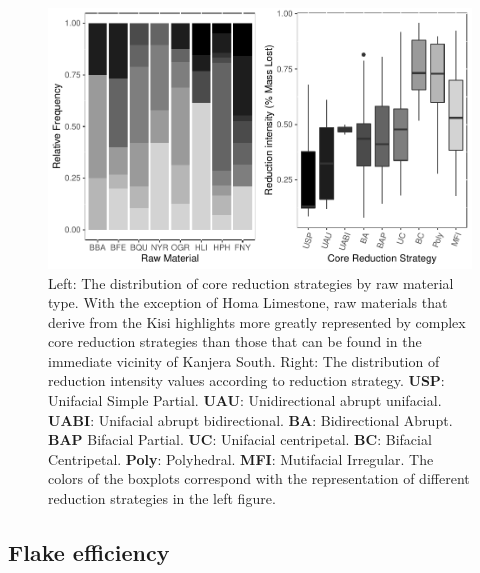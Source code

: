 \documentclass[]{elsarticle} %
\makeatletter
\def\maxwidth{\ifdim\Gin@nat@width>\linewidth\linewidth
\else\Gin@nat@width\fi}
\let\Oldincludegraphics\includegraphics
\renewcommand{\includegraphics}[1]{\Oldincludegraphics[width=\maxwidth]{#1}}
\makeatother
\begin{document}
\begin{figure}
\centering
\includegraphics{Reeves_Braun_et_al_2020_Kanjera_South_JHE_files/figure-latex/fig-6-1.pdf}
\caption{Left: The distribution of core reduction strategies by raw
material type. With the exception of Homa Limestone, raw materials that
derive from the Kisi highlights more greatly represented by complex core
reduction strategies than those that can be found in the immediate
vicinity of Kanjera South. Right: The distribution of reduction
intensity values according to reduction strategy. \textbf{USP}:
Unifacial Simple Partial. \textbf{UAU}: Unidirectional abrupt unifacial.
\textbf{UABI}: Unifacial abrupt bidirectional. \textbf{BA}:
Bidirectional Abrupt. \textbf{BAP} Bifacial Partial. \textbf{UC}:
Unifacial centripetal. \textbf{BC}: Bifacial Centripetal. \textbf{Poly}:
Polyhedral. \textbf{MFI}: Mutifacial Irregular. The colors of the
boxplots correspond with the representation of different reduction
strategies in the left figure. \label{core.tech}}
\end{figure}

\hypertarget{flake-efficiency}{%
\subsection{Flake efficiency}\label{flake-efficiency}}
\end{document}
